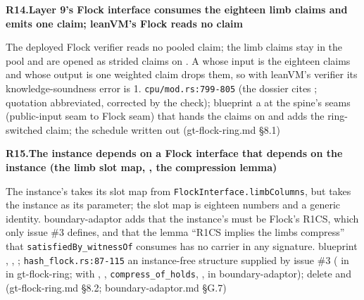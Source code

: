 \par\medskip\noindent\textbf{R14.}\enspace\textbf{Layer 9's Flock interface consumes the eighteen limb claims and emits one claim; leanVM's Flock reads no claim}\par\nopagebreak
{} The deployed Flock verifier reads no pooled claim; the limb claims stay in the pool and are opened as strided claims on . A  whose input is the eighteen claims and whose output is one weighted claim drops them, so with leanVM's verifier its knowledge-soundness error is 1.
 \texttt{cpu/\allowbreak{}mod.\allowbreak{}rs:\allowbreak{}799-\allowbreak{}805} (the dossier cites ; quotation abbreviated, corrected by the check); blueprint 
 a  at the spine's seams (public-input seam to Flock seam) that hands the claims on and adds the ring-switched claim; the schedule written out (gt-flock-ring.md §8.1)

\par\medskip\noindent\textbf{R15.}\enspace\textbf{The instance depends on a Flock interface that depends on the instance (the limb slot map, , the compression lemma)}\par\nopagebreak
{} The instance's  takes its slot map from \texttt{Flock\allowbreak{}Interface.\allowbreak{}limb\allowbreak{}Columns}, but  takes the instance as its parameter; the slot map is eighteen numbers and a generic identity. boundary-adaptor adds that the instance's  must be Flock's R1CS, which only issue \#3 defines, and that the lemma ``R1CS implies the limbs compress'' that \texttt{satisfied\allowbreak{}By\_\allowbreak{}witness\allowbreak{}Of} consumes has no carrier in any signature.
 blueprint , , ; \texttt{hash\_\allowbreak{}flock.\allowbreak{}rs:\allowbreak{}87-\allowbreak{}115}
 an instance-free structure supplied by issue \#3 ( in  in gt-flock-ring;  with , , \texttt{compress\_\allowbreak{}of\_\allowbreak{}holds}, ,  in boundary-adaptor); delete  and  (gt-flock-ring.md §8.2; boundary-adaptor.md §G.7)

